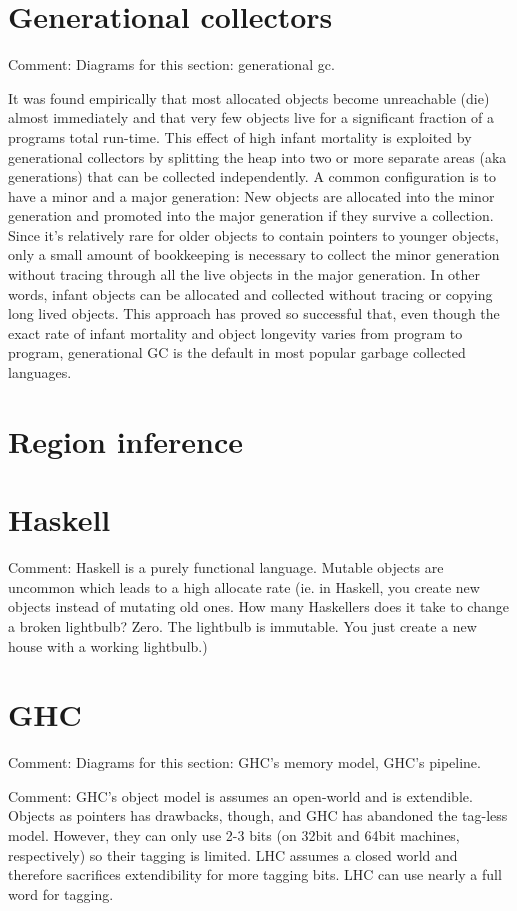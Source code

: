 \documentclass[a4paper,oneside]{memoir}
\newcommand{\makecomment}[1]{{\color{red} Comment: #1}}
\begin{document}
\section{Generational collectors}
\makecomment{Diagrams for this section: generational gc.}

It was found empirically that most allocated objects become unreachable (die)
almost immediately and that very few objects live for a significant fraction
of a programs total run-time. This effect of high infant mortality is exploited
by generational collectors by splitting the heap into two or more separate areas
(aka generations) that can be collected independently. A common configuration is
to have a minor and a major generation: New objects are allocated into the minor
generation and promoted into the major generation if they survive a collection.
Since it's relatively rare for older objects to contain pointers to younger
objects, only a small amount of bookkeeping is necessary to collect the minor
generation without tracing through all the live objects in the major generation.
In other words, infant objects can be allocated and collected without tracing or
copying long lived objects. This approach has proved so successful that, even
though the exact rate of infant mortality and object longevity varies from
program to program, generational GC is the default in most popular garbage
collected languages.

\section{Region inference}


\section{Haskell}
\makecomment{Haskell is a purely functional language.\cite{HaskellReport} Mutable objects are
uncommon which leads to a high allocate rate (ie. in Haskell, you create new
objects instead of mutating old ones. How many Haskellers does it take to
change a broken lightbulb? Zero. The lightbulb is immutable. You just create
a new house with a working lightbulb.)}

\section{GHC}
\makecomment{Diagrams for this section: GHC's memory model, GHC's pipeline.}

\makecomment{GHC's object model is assumes an open-world and is extendible.
Objects as pointers has drawbacks, though, and GHC has abandoned the tag-less
model. However, they can only use 2-3 bits (on 32bit and 64bit machines,
respectively) so their tagging is limited. LHC assumes a closed world and therefore
sacrifices extendibility for more tagging bits. LHC can use nearly a full word
for tagging.}
\end{document}
